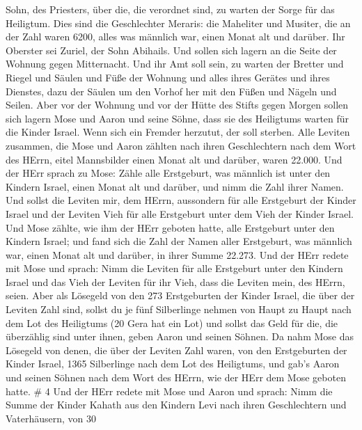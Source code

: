 Sohn, des Priesters, über die, die verordnet sind, zu warten der Sorge
für das Heiligtum.  Dies sind die Geschlechter Meraris: die
Maheliter und Musiter,  die an der Zahl waren 6200, alles
was männlich war, einen Monat alt und darüber.  Ihr
Oberster sei Zuriel, der Sohn Abihails. Und sollen sich lagern an die
Seite der Wohnung gegen Mitternacht.  Und ihr Amt soll
sein, zu warten der Bretter und Riegel und Säulen und Füße der Wohnung
und alles ihres Gerätes und ihres Dienstes,  dazu der
Säulen um den Vorhof her mit den Füßen und Nägeln und Seilen.
 Aber vor der Wohnung und vor der Hütte des Stifts gegen
Morgen sollen sich lagern Mose und Aaron und seine Söhne, dass sie des
Heiligtums warten für die Kinder Israel. Wenn sich ein Fremder herzutut,
der soll sterben.  Alle Leviten zusammen, die Mose und
Aaron zählten nach ihren Geschlechtern nach dem Wort des HErrn, eitel
Mannsbilder einen Monat alt und darüber, waren 22.000.  Und
der HErr sprach zu Mose: Zähle alle Erstgeburt, was männlich ist unter
den Kindern Israel, einen Monat alt und darüber, und nimm die Zahl ihrer
Namen.  Und sollst die Leviten mir, dem HErrn, aussondern
für alle Erstgeburt der Kinder Israel und der Leviten Vieh für alle
Erstgeburt unter dem Vieh der Kinder Israel.  Und Mose
zählte, wie ihm der HErr geboten hatte, alle Erstgeburt unter den
Kindern Israel;  und fand sich die Zahl der Namen aller
Erstgeburt, was männlich war, einen Monat alt und darüber, in ihrer
Summe 22.273.  Und der HErr redete mit Mose und sprach:
 Nimm die Leviten für alle Erstgeburt unter den Kindern
Israel und das Vieh der Leviten für ihr Vieh, dass die Leviten mein, des
HErrn, seien.  Aber als Lösegeld von den 273 Erstgeburten
der Kinder Israel, die über der Leviten Zahl sind,  sollst
du je fünf Silberlinge nehmen von Haupt zu Haupt nach dem Lot des
Heiligtums (20 Gera hat ein Lot)  und sollst das Geld für
die, die überzählig sind unter ihnen, geben Aaron und seinen Söhnen.
 Da nahm Mose das Lösegeld von denen, die über der Leviten
Zahl waren,  von den Erstgeburten der Kinder Israel, 1365
Silberlinge nach dem Lot des Heiligtums,  und gab's Aaron
und seinen Söhnen nach dem Wort des HErrn, wie der HErr dem Mose geboten
hatte. \# 4  Und der HErr redete mit Mose und Aaron und
sprach:  Nimm die Summe der Kinder Kahath aus den Kindern
Levi nach ihren Geschlechtern und Vaterhäusern,  von 30
